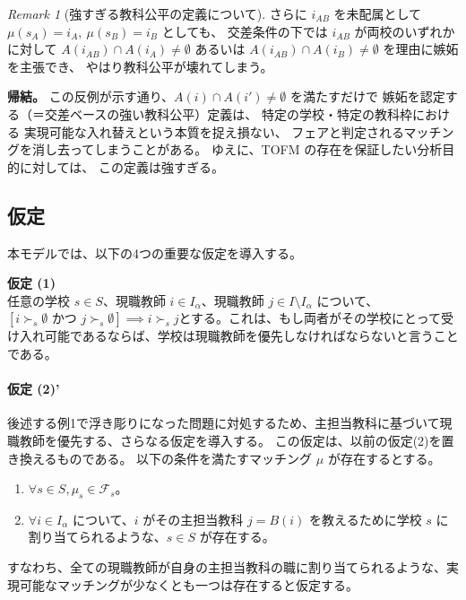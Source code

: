 \documentclass[12pt, a4paper]{article}
\theoremstyle{definition}
\theoremstyle{remark}
\newtheorem{remark}{Remark}
\theoremstyle{plain}
\begin{document}
\begin{remark}[強すぎる教科公平の定義について]
さらに $i_{AB}$ を未配属として $\mu(s_A)=i_A,\ \mu(s_B)=i_B$ としても、
交差条件の下では $i_{AB}$ が両校のいずれかに対して
$A(i_{AB})\cap A(i_A)\neq\emptyset$ あるいは
$A(i_{AB})\cap A(i_B)\neq\emptyset$ を理由に嫉妬を主張でき、
やはり教科公平が壊れてしまう。

\medskip
\noindent\textbf{帰結。}
この反例が示す通り、$A(i)\cap A(i')\neq\emptyset$ を満たすだけで
嫉妬を認定する（＝交差ベースの強い教科公平）定義は、
特定の学校・特定の教科枠における 実現可能な入れ替えという本質を捉え損ない、
フェアと判定されるマッチングを消し去ってしまうことがある。
ゆえに、TOFM の存在を保証したい分析目的に対しては、
この定義は強すぎる。
\end{remark}



\subsection{仮定}
本モデルでは、以下の4つの重要な仮定を導入する。


\vspace{0.5\baselineskip}
\noindent\textbf{仮定 (1)} \\
任意の学校 $s \in S$、現職教師 $i \in I_\alpha$、現職教師 $j \in I\setminus I_\alpha$ について、$[i \succ_s \emptyset \text{ かつ } j \succ_s \emptyset] \implies i \succ_s j$とする。これは、もし両者がその学校にとって受け入れ可能であるならば、学校は現職教師を優先しなければならないと言うことである。

\vspace{0.5\baselineskip}
\paragraph{\textbf{仮定 (2)'}}
後述する例1で浮き彫りになった問題に対処するため、主担当教科に基づいて現職教師を優先する、さらなる仮定を導入する。
この仮定は、以前の仮定(2)を置き換えるものである。
以下の条件を満たすマッチング $\mu$ が存在するとする。
\begin{enumerate}
    \item $\forall s \in S, \mu_s \in \mathcal{F}_s$。
    \item $\forall i \in I_\alpha$ について、$i$ がその主担当教科 $j=B(i)$ を教えるために学校 $s$ に割り当てられるような、$s \in S$ が存在する。
\end{enumerate}
すなわち、全ての現職教師が自身の主担当教科の職に割り当てられるような、実現可能なマッチングが少なくとも一つは存在すると仮定する。
\end{document}
